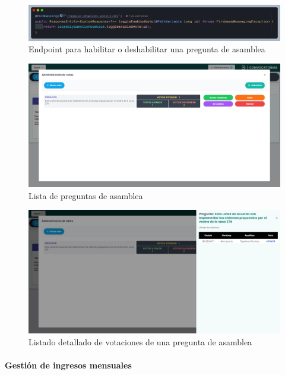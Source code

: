 \begin{figure}[H]
    \centering
    \includegraphics[width=1\textwidth]{resources/images/api-pregunta-toggle}
    \caption{Endpoint para habilitar o deshabilitar una pregunta de asamblea}
    \label{fig:api-question-toggle}
\end{figure}

\begin{figure}[H]
    \centering
    \includegraphics[width=1\textwidth]{resources/images/sw-asamblea-votaciones}
    \caption{Lista de preguntas de asamblea}
    \label{fig:sw-asamblea-votaciones}
\end{figure}

\begin{figure}[H]
    \centering
    \includegraphics[width=1\textwidth]{resources/images/sw-asamblea-votaciones-detalle}
    \caption{Listado detallado de votaciones de una pregunta de asamblea}
    \label{fig:sw-asamblea-votaciones-detail}
\end{figure}

\paragraph{Gestión de ingresos mensuales}

